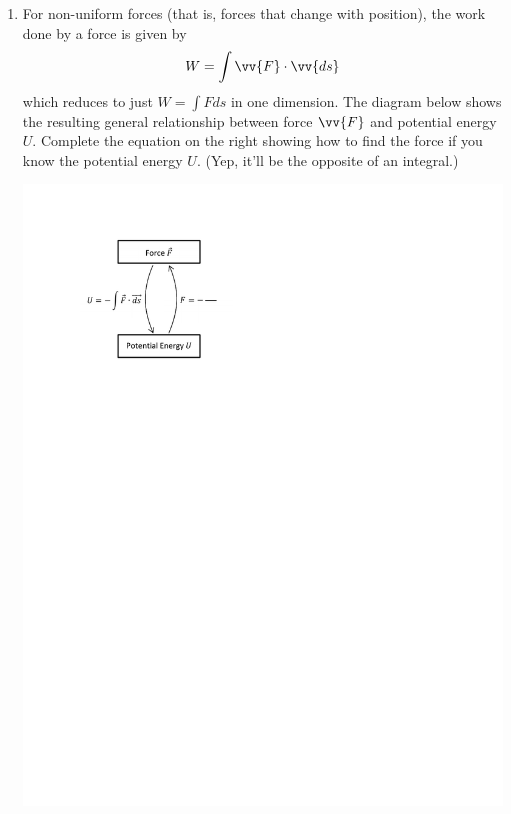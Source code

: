 \begin{enumerate}[labparts]
\pagebreak[3]

\item For non-uniform forces (that is, forces that change with position), the work done by a force is given by 
$$W=\int{\vv{F} \cdot \vv{ds}}$$
which reduces to just $W=\int{F ds}$ in one dimension.  The diagram below shows the resulting general relationship between force $\vv{F}$ and potential energy $U$.  Complete the equation on the right showing how to find the force if you know the potential energy $U$.  (Yep, it'll be the opposite of an integral.)
\begin{center}
\vspace{-0.1in}
\includegraphics{potential_intro/concept_map_figs/concept_map_F_and_U_blank_squish.pdf}
\end{center}



\end{enumerate}
